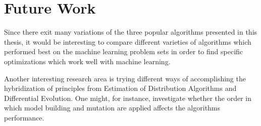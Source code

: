 \section{Future Work}

Since there exit many variations of the three popular algorithms presented in this thesis, it would be interesting to compare different varieties of algorithms which performed best on the machine learning problem sets in order to find specific optimizations which work well with machine learning.

Another interesting research area is trying different ways of accomplishing the hybridization of principles from Estimation of Distribution Algorithms and Differential Evolution. One might, for instance, investigate whether the order in which model building and mutation are applied affects the algorithms performance.
